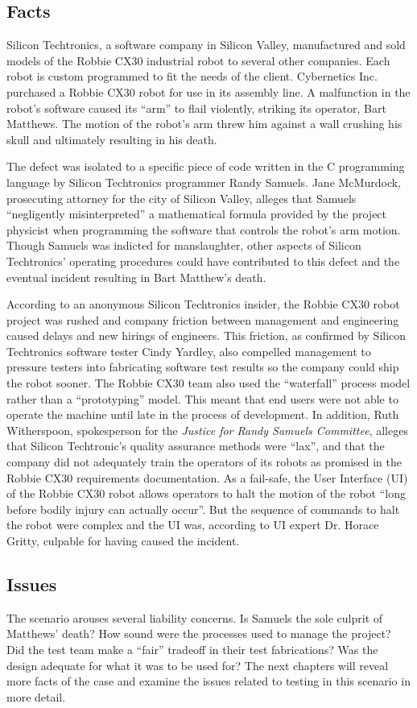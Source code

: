 \subsection{Facts}\label{killerfacts}

Silicon Techtronics, a software company in Silicon Valley, manufactured and
sold models of the Robbie CX30 industrial robot to several other companies. Each
robot is custom programmed to fit the needs of the client. Cybernetics Inc.
purchased a Robbie CX30 robot for use in its assembly line. A malfunction in the
robot's software caused its ``arm'' to flail violently, striking its operator,
Bart Matthews. The motion of the robot's arm threw him against a wall crushing
his skull and ultimately resulting in his death.

The defect was isolated to a specific piece of code written in the C programming
language by Silicon Techtronics programmer Randy Samuels. Jane McMurdock,
prosecuting attorney for the city of Silicon Valley, alleges that Samuels
``negligently misinterpreted'' a mathematical formula provided by the project
physicist when programming the software that controls the robot's arm motion. 
Though Samuels was indicted for manslaughter, other aspects of Silicon
Techtronics' operating procedures could have contributed to this defect and the
eventual incident resulting in Bart Matthew's death.

According to an anonymous Silicon Techtronics insider, the Robbie CX30 robot
project was rushed and company friction between management and engineering 
caused delays and new hirings of engineers. This friction, as confirmed by
Silicon Techtronics software tester Cindy Yardley, also compelled management to
pressure testers into fabricating software test results so the company could 
ship the robot sooner. The Robbie CX30 team also used the ``waterfall''
\cite{Royce70} process model rather than a ``prototyping'' model. This meant
that end users were not able to operate the machine until late in the process of
development. In addition, Ruth Witherspoon, spokesperson for the \textit{Justice
for Randy Samuels Committee}, alleges that Silicon Techtronic's quality 
assurance methods were ``lax'', and that the company did not adequately train
the operators of its robots as promised in the Robbie CX30 requirements
documentation. As a fail-safe, the User Interface (UI) of the Robbie CX30 robot
allows operators to halt the motion of the robot ``long before bodily injury can
actually occur''. But the sequence of commands to halt the robot were complex
and the UI was, according to UI expert Dr. Horace Gritty, culpable for having
caused the incident.

\subsection{Issues}

The scenario arouses several liability concerns. Is Samuels the sole culprit of
Matthews' death? How sound were the processes used to manage the project? Did
the test team make a ``fair'' tradeoff in their test fabrications? Was the
design adequate for what it was to be used for? The next chapters will reveal
more facts of the case and examine the issues related to testing in this
scenario in more detail.
